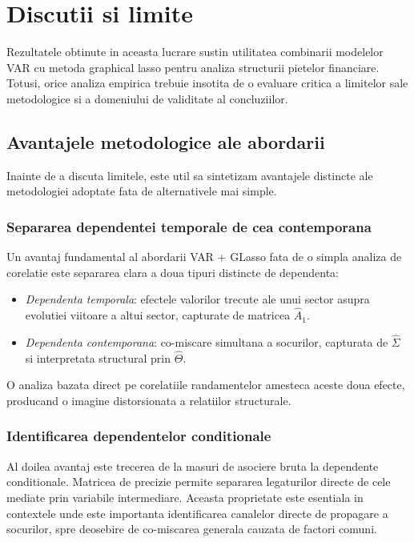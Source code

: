 \chapter{Discutii si limite}

Rezultatele obtinute in aceasta lucrare sustin utilitatea combinarii modelelor
VAR cu metoda graphical lasso pentru analiza structurii pietelor financiare.
Totusi, orice analiza empirica trebuie insotita de o evaluare critica a limitelor
sale metodologice si a domeniului de validitate al concluziilor.

\section{Avantajele metodologice ale abordarii}

Inainte de a discuta limitele, este util sa sintetizam avantajele distincte ale
metodologiei adoptate fata de alternativele mai simple.

\subsection{Separarea dependentei temporale de cea contemporana}

Un avantaj fundamental al abordarii VAR + GLasso fata de o simpla analiza
de corelatie este separarea clara a doua tipuri distincte de dependenta:
\begin{itemize}
    \item \textit{Dependenta temporala}: efectele valorilor trecute ale unui
    sector asupra evolutiei viitoare a altui sector, capturate de matricea
    $\hat{A}_1$.
    \item \textit{Dependenta contemporana}: co-miscare simultana a socurilor,
    capturata de $\hat{\Sigma}$ si interpretata structural prin $\hat{\Theta}$.
\end{itemize}
O analiza bazata direct pe corelatiile randamentelor amesteca aceste doua
efecte, producand o imagine distorsionata a relatiilor structurale.

\subsection{Identificarea dependentelor conditionale}

Al doilea avantaj este trecerea de la masuri de asociere bruta la dependente
conditionale. Matricea de precizie permite separarea legaturilor directe de
cele mediate prin variabile intermediare. Aceasta proprietate este esentiala
in contextele unde este importanta identificarea canalelor directe de propagare
a socurilor, spre deosebire de co-miscarea generala cauzata de factori comuni.


